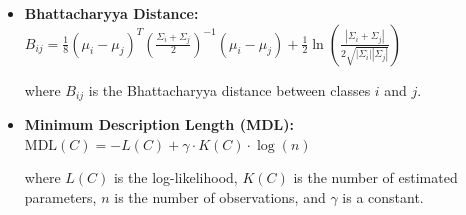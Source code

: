 \documentclass[10pt,svgnames,fragile]{beamer}
\begin{document}
\begin{frame}{}
\begin{itemize}
\begin{itemize}
    \item \textbf{Bhattacharyya Distance:}
    \(
    B_{ij} = \frac{1}{8} (\mu_i - \mu_j)^T \left( \frac{\Sigma_i + \Sigma_j}{2} \right)^{-1} (\mu_i - \mu_j) + \frac{1}{2} \ln \left( \frac{|\Sigma_i + \Sigma_j|}{2 \sqrt{|\Sigma_i||\Sigma_j|}} \right)
    \)
    
    where \( B_{ij} \) is the Bhattacharyya distance between classes \( i \) and \( j \).

    \item \textbf{Minimum Description Length (MDL):}
    \(
    \text{MDL}(C) = -L(C) + \gamma \cdot K(C) \cdot \log(n)
    \)
    
    where \( L(C) \) is the log-likelihood, \( K(C) \) is the number of estimated parameters, \( n \) is the number of observations, and \( \gamma \) is a constant.
    \end{itemize}
    
\end{itemize}
\end{frame}
\end{document}
